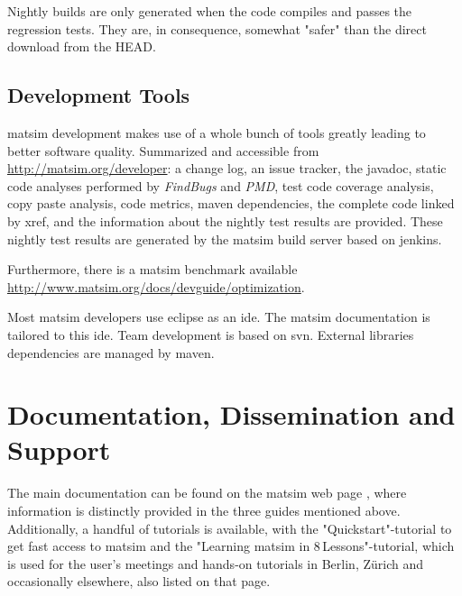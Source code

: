 Nightly builds are only generated when the code compiles and passes the regression tests.  They are, in consequence, somewhat "safer" than the direct download from the HEAD.

\subsection{Development Tools}

\gls{matsim} development makes use of a whole bunch of tools greatly leading to better software quality. Summarized and accessible from \url{http://matsim.org/developer}:
%
a change log, an issue tracker, the \gls{javadoc}, static code analyses performed by \emph{FindBugs} and \emph{PMD}, test code coverage analysis, copy paste analysis, code metrics, \gls{maven} dependencies, the complete code linked by \gls{xref}, and the information about the nightly test results are provided. These nightly test results are generated by the \gls{matsim} build server based on \gls{jenkins}. 

Furthermore, there is a \gls{matsim} benchmark available \url{http://www.matsim.org/docs/devguide/optimization}.

Most \gls{matsim} developers use \gls{eclipse} as an \gls{ide}. The \gls{matsim} documentation is tailored to this \gls{ide}. Team development is based on \gls{svn}. External libraries dependencies are managed by \gls{maven}. 

\section{Documentation, Dissemination and Support}
The main documentation can be found on the \gls{matsim} web page \citep[][]{MATSIM-Docu_Webpage_2015}, where information is distinctly provided in the three guides mentioned above. Additionally, a handful of tutorials is available, with the "Quickstart"-tutorial to get fast access to \gls{matsim} and the "Learning \gls{matsim} in 8\,Lessons"-tutorial, which is used for the user's meetings and hands-on tutorials in Berlin, Zürich and occasionally elsewhere, also listed on that page. 

